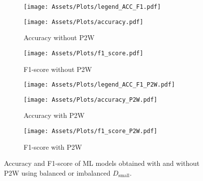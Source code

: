 \documentclass[letterpaper]{article}
\begin{document}
\begin{figure}[!t]
    \centering

    \begin{subfigure}[b]{\textwidth}
        \texttt{[image: Assets/Plots/legend\_ACC\_F1.pdf]}
    \end{subfigure}

    
    
    \begin{subfigure}[b]{0.49\columnwidth}
        \texttt{[image: Assets/Plots/accuracy.pdf]}
        \caption{Accuracy without P2W}
        \label{fig:acc}
    \end{subfigure}
    \hfill
    \begin{subfigure}[b]{0.49\columnwidth}
        \texttt{[image: Assets/Plots/f1\_score.pdf]}
        \caption{F1-score without P2W}
        \label{fig:f1_score}
    \end{subfigure}
   
\vspace{2pt}


    \begin{subfigure}[b]{\textwidth}
        \texttt{[image: Assets/Plots/legend\_ACC\_F1\_P2W.pdf]}
    \end{subfigure}


    
    \begin{subfigure}[b]{0.49\columnwidth}
        \texttt{[image: Assets/Plots/accuracy\_P2W.pdf]}
        \caption{Accuracy with P2W}
        \label{fig:acc_P2W}
    \end{subfigure}
    \hfill
    \begin{subfigure}[b]{0.49\columnwidth}
        \texttt{[image: Assets/Plots/f1\_score\_P2W.pdf]}
        \caption{F1-score with P2W}
        \label{fig:f1_score_P2W}
    \end{subfigure}
 
    
    \caption{Accuracy and F1-score of ML models obtained with and without P2W using balanced or imbalanced $D_\text{small}$.}
    \label{fig:ACC-F1}
    \vspace{-17pt}
\end{figure}
\end{document}
